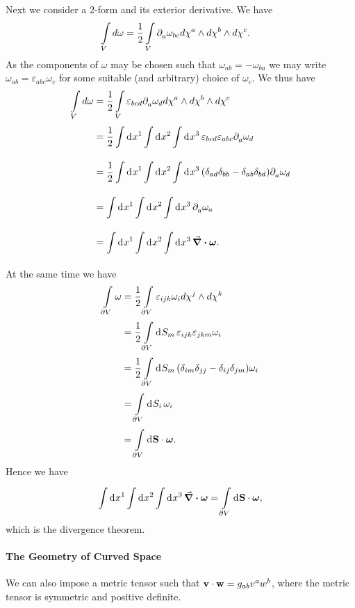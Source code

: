 Next we consider a $2$-form and its exterior derivative. We have
\begin{align*}
	\int\limits_{V}d\omega &= \frac{1}{2}\int\limits_{V}\partial^{}_{a}\omega_{bc}d\chi^{a}\wedge d\chi^{b}\wedge d\chi^{c}.
\end{align*}
As the components of $\omega$ may be chosen such that $\omega_{ab} = -\omega_{ba}$ we may write $\omega_{ab} = \varepsilon_{abc}\omega_{c}$ for some suitable (and arbitrary) choice of $\omega_{c}$. We thus have
\begin{align*}
	\int\limits_{V}d\omega &= \frac{1}{2}\int\limits_{V}\varepsilon_{bcd}\partial^{}_{a}\omega_{d}d\chi^{a}\wedge d\chi^{b}\wedge d\chi^{c} \\
	                        &= \frac{1}{2}\int\limits_{}^{}\dd[]{x^{1}}\int\limits_{}^{}\dd[]{x^{2}}\int\limits_{}^{}\dd[]{x^{3}}\varepsilon_{bcd}\varepsilon_{abc}\partial^{}_{a}\omega_{d} \\
	                        &= \frac{1}{2}\int\limits_{}^{}\dd[]{x^{1}}\int\limits_{}^{}\dd[]{x^{2}}\int\limits_{}^{}\dd[]{x^{3}}(\delta_{ad}\delta_{bb} - \delta_{ab}\delta_{bd})\partial^{}_{a}\omega_{d} \\
	                        &= \int\limits_{}^{}\dd[]{x^{1}}\int\limits_{}^{}\dd[]{x^{2}}\int\limits_{}^{}\dd[]{x^{3}}\partial^{}_{a}\omega_{a} \\
	                        &= \int\limits_{}^{}\dd[]{x^{1}}\int\limits_{}^{}\dd[]{x^{2}}\int\limits_{}^{}\dd[]{x^{3}}\div{\vb*{\omega}}.
\end{align*}
At the same time we have
\begin{align*}
	\int\limits_{\partial V}\omega &= \frac{1}{2}\int\limits_{\partial V}\varepsilon_{ijk}\omega_{i}d\chi^{j}\wedge d\chi^{k} \\
	                           &= \frac{1}{2}\int\limits_{\partial V}^{}\dd[]{S_{m}}\varepsilon_{ijk}\varepsilon_{jkm}\omega_{i} \\
	                           &= \frac{1}{2}\int\limits_{\partial V}^{}\dd[]{S_{m}}(\delta_{im}\delta_{jj} - \delta_{ij}\delta_{jm})\omega_{i} \\
	                           &= \int\limits_{\partial V}^{}\dd[]{S_{i}}\omega_{i} \\
	                           &= \int\limits_{\partial V}^{}\dd[]{\vb{S}}\cdot\vb*{\omega}.
\end{align*}
Hence we have
\begin{align*}
	\int\limits_{}^{}\dd[]{x^{1}}\int\limits_{}^{}\dd[]{x^{2}}\int\limits_{}^{}\dd[]{x^{3}}\div{\vb*{\omega}} = \int\limits_{\partial V}^{}\dd[]{\vb{S}}\cdot\vb*{\omega},
\end{align*}
which is the divergence theorem.

\paragraph{The Geometry of Curved Space}
We can also impose a metric tensor such that $\vb{v}\cdot\vb{w} = g_{ab}v^{a}w^{b}$, where the metric tensor is symmetric and positive definite.


